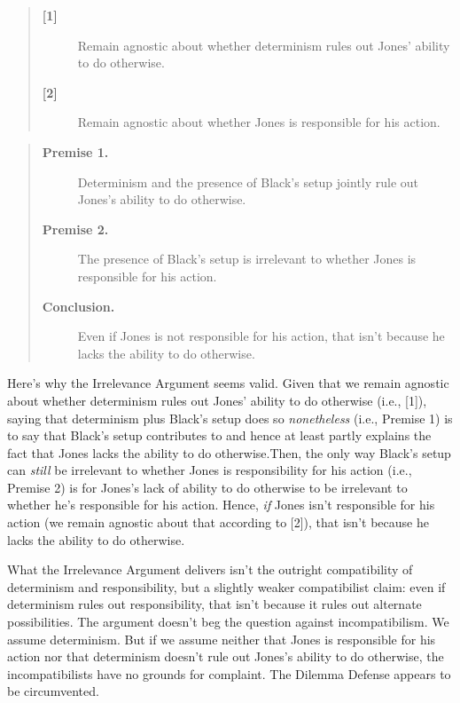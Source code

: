 \documentclass[a4paper,12pt]{article}
\begin{document}
\begin{quote}
\begin{description}
\item[\textbf{[1]}] Remain agnostic about whether determinism rules out Jones' ability to do otherwise.
\item[\textbf{[2]}] Remain agnostic about whether Jones is responsible for his action.
\end{description}
\end{quote}

\begin{quote}
\begin{description}
\item[\textbf{Premise 1.}] Determinism and the presence of Black's setup jointly rule out Jones's ability to do otherwise.
\item[\textbf{Premise 2.}] The presence of Black's setup is irrelevant to whether Jones is responsible for his action.
\item[\textbf{Conclusion.}] Even if Jones is not responsible for his action, that isn't because he lacks the ability to do otherwise.
\end{description}
\end{quote}

Here's why the Irrelevance Argument seems valid. Given that we remain agnostic about whether determinism rules out Jones' ability to do otherwise (i.e., [1]), saying that determinism plus Black's setup does so \emph{nonetheless} (i.e., Premise 1) is to say that Black's setup contributes to and hence at least partly explains the fact that Jones lacks the ability to do otherwise.\footnotemark Then, the only way Black's setup can \emph{still} be irrelevant to whether Jones is responsibility for his action (i.e., Premise 2) is for Jones's lack of ability to do otherwise to be irrelevant to whether he's responsible for his action. Hence, \emph{if} Jones isn't responsible for his action (we remain agnostic about that according to [2]), that isn't because he lacks the ability to do otherwise.


What the Irrelevance Argument delivers isn't the outright compatibility of determinism and responsibility, but a slightly weaker compatibilist claim: even if determinism rules out responsibility, that isn't because it rules out alternate possibilities. The argument doesn't beg the question against incompatibilism. We assume determinism. But if we assume neither that Jones is responsible for his action nor that determinism doesn't rule out Jones's ability to do otherwise, the incompatibilists have no grounds for complaint. The Dilemma Defense appears to be circumvented.
\end{document}
